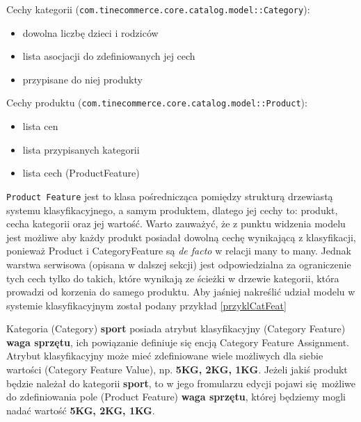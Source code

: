 \noindent Cechy kategorii (\texttt{com.tinecommerce.core.catalog.model::Category}):
\begin{itemize}
	\item dowolna liczbę dzieci i rodziców
	\item lista asocjacji do zdefiniowanych jej cech
	\item przypisane do niej produkty
\end{itemize} 
Cechy produktu (\texttt{com.tinecommerce.core.catalog.model::Product}):
\begin{itemize}
	\item lista cen
	\item lista przypisanych kategorii
	\item lista cech (ProductFeature)
\end{itemize}
\texttt{Product Feature} jest to klasa pośrednicząca pomiędzy strukturą drzewiastą systemu klasyfikacyjnego, a samym produktem, dlatego jej cechy to: produkt, cecha kategorii oraz jej wartość. Warto zauważyć, że z punktu widzenia modelu jest możliwe aby każdy produkt posiadał dowolną cechę wynikającą z klasyfikacji, ponieważ Product i CategoryFeature są  \textit{de facto} w relacji many to many. Jednak warstwa serwisowa (opisana w dalszej sekcji) jest odpowiedzialna za ograniczenie tych cech tylko do takich, które wynikają ze ścieżki w drzewie kategorii, która prowadzi od korzenia do samego produktu. Aby jaśniej nakreślić udział modelu w systemie klasyfikacyjnym został podany przykład \ref{przyklCatFeat}
\begin{example}
	\label{przyklCatFeat}
	Kategoria (Category) \textbf{sport} posiada atrybut klasyfikacyjny (Category Feature) \textbf{waga sprzętu}, ich powiązanie definiuje się encją Category Feature Assignment. Atrybut klasyfikacyjny może mieć zdefiniowane wiele możliwych dla siebie wartości (Category Feature Value), np. \textbf{5KG, 2KG, 1KG}. Jeżeli jakiś produkt będzie należał do kategorii \textbf{sport}, to w jego fromularzu edycji pojawi się możliwe do zdefiniowania pole (Product Feature) \textbf{waga sprzętu}, której będziemy mogli nadać wartość \textbf{5KG, 2KG, 1KG}.
\end{example}

